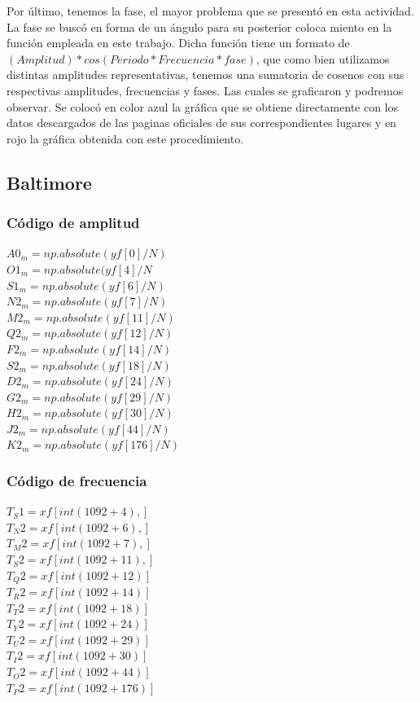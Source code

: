 \documentclass[a4paper,12pt]{article}
\begin{document}
Por último, tenemos la fase, el mayor problema que se presentó en esta actividad. La fase se buscó en forma de un ángulo para su posterior coloca miento en la función empleada en este trabajo. Dicha función tiene un formato de $(Amplitud)*cos(Periodo*Frecuencia*fase) $, que como bien utilizamos distintas amplitudes representativas, tenemos una sumatoria de cosenos con sus respectivas amplitudes, frecuencias y fases. Las cuales se graficaron y podremos observar. Se colocó en color azul la gráfica que se obtiene directamente con los datos descargados de las paginas oficiales de sus correspondientes lugares y en rojo la gráfica obtenida con este procedimiento.


\subsection{Baltimore}
\subsubsection{Código de amplitud}
\noindent
$A0_m = np.absolute(yf[0]/N)$\\
$O1_m = np.absolute(yf[4]/N$\\
$S1_m = np.absolute(yf[6]/N)$\\
$N2_m = np.absolute(yf[7]/N)$\\
$M2_m = np.absolute(yf[11]/N)$\\
$Q2_m = np.absolute(yf[12]/N)$\\
$F2_m = np.absolute(yf[14]/N)$\\
$S2_m = np.absolute(yf[18]/N)$\\
$D2_m = np.absolute(yf[24]/N)$\\
$G2_m = np.absolute(yf[29]/N)$\\
$H2_m = np.absolute(yf[30]/N)$\\
$J2_m = np.absolute(yf[44]/N)$\\
$K2_m =np.absolute(yf[176]/N)$

\subsubsection{Código de frecuencia}
\noindent
$T_S1 =  xf[int(1092 +4),]$\\
$T_N2 =  xf[int(1092 +6),]$\\
$T_M2 =  xf[int(1092 +7),]$\\
$T_S2 =  xf[int(1092 +11),]$\\
$T_Q2 =  xf[int(1092+12)]$\\
$T_R2 =  xf[int(1092+14)]$\\
$T_T2 =  xf[int(1092+18)]$\\
$T_Y2 =  xf[int(1092+24)]$\\
$T_U2 =  xf[int(1092+29)]$\\
$T_I2 =  xf[int(1092+30)]$\\
$T_O2 =  xf[int(1092+44)]$\\
$T_P2 =  xf[int(1092+176)]$\\
\end{document}
